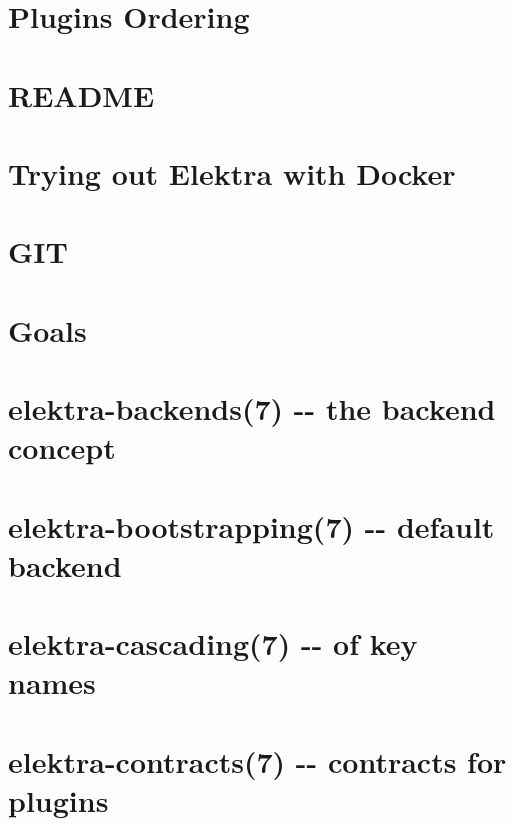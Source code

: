 \documentclass[twoside]{book}
\newcommand{\+}{\discretionary{\mbox{\scriptsize$\hookleftarrow$}}{}{}}
\begin{document}
\chapter{Plugins Ordering}
\label{doc_dev_plugins-ordering_md}

\chapter{R\+E\+A\+D\+ME}
\label{md_doc_dev_README}

\chapter{Trying out Elektra with Docker}
\label{doc_docker_README_md}

\chapter{G\+IT}
\label{doc_GIT_md}

\chapter{Goals}
\label{doc_GOALS_md}

\chapter{elektra-\/backends(7) -\/-\/ the backend concept}
\label{md_doc_help_elektra-backends}

\chapter{elektra-\/bootstrapping(7) -\/-\/ default backend}
\label{md_doc_help_elektra-bootstrapping}

\chapter{elektra-\/cascading(7) -\/-\/ of key names}
\label{md_doc_help_elektra-cascading}

\chapter{elektra-\/contracts(7) -\/-\/ contracts for plugins}
\label{md_doc_help_elektra-contracts}

\end{document}
